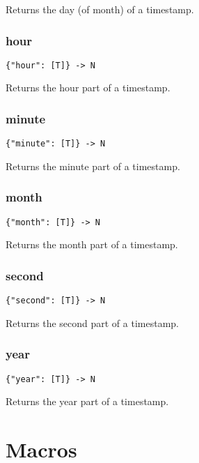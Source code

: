 \documentclass[a4paper]{article}
\begin{document}
Returns the day (of month) of a timestamp.

\subsubsection{hour}

\begin{verbatim}
{"hour": [T]} -> N
\end{verbatim}

Returns the hour part of a timestamp.

\subsubsection{minute}

\begin{verbatim}
{"minute": [T]} -> N
\end{verbatim}

Returns the minute part of a timestamp.

\subsubsection{month}

\begin{verbatim}
{"month": [T]} -> N
\end{verbatim}

Returns the month part of a timestamp.

\subsubsection{second}

\begin{verbatim}
{"second": [T]} -> N
\end{verbatim}

Returns the second part of a timestamp.

\subsubsection{year}

\begin{verbatim}
{"year": [T]} -> N
\end{verbatim}

Returns the year part of a timestamp.

\section{Macros}
\end{document}
